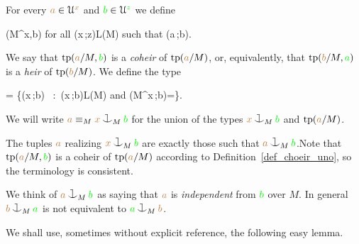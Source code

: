 \begin{definition}\label{def_coheir_idepencence} 
  For every ${\color{brown} a}\in\EuScript U^{\color{brown} x}$ and ${\color{green} b}\in\EuScript U^{\color{green} z}$ we define

  \noindent\llap{\textcolor{red}{\Large\warning}\kern1.5ex}
  {\IFF}
  {\phi(M^{\mr x},{\gr b})\neq\0
  \textrm{ for all }\phi({\mr x}\,;{\gr z})\in L(M) 
  \textrm{ such that }\phi({\mr a}\,;{\gr b})}.

  We say that ${\rm tp}({\color{brown} a}/M,{\color{green} b})$ is a \emph{coheir} of ${\rm tp}({\color{brown} a}/M)$, or, equivalently, that ${\rm tp}({\color{brown} b}/M,{\color{green} a})$ is a \emph{heir} of ${\rm tp}({\color{brown} b}/M)$.
  We define the type

  {=}
  {\Big\{\neg\phi({\mr x}\,;{\gr b})
  \ :\ 
  \phi({\mr x}\,;{\gr b})\in L(M)
  \textrm{ and } \phi(M^{\mr x}\,;{\gr b})=\0\Big\}.}

  We will write \emph{${\mr a}\equiv_M{\mr x}\cnonfork_M{\gr b}$} 
  for the union of the types ${\mr x}\cnonfork_M{\gr b}$ and 
  ${\rm tp}({\color{brown} a}/M)$.
\end{definition}
 The tuples ${\color{brown} a}$ realizing ${\mr x}\cnonfork_M{\gr b}$ are exactly those such that ${\mr a}\cnonfork_M{\gr b}$.Note that ${\rm tp}({\color{brown} a}/M,{\color{green} b})$ is a coheir of ${\rm tp}({\color{brown} a}/M)$ according to Definition~\ref{def_choeir_uno}, so the terminology is consistent.

We think of  ${\mr a}\cnonfork_M{\gr b}$ as saying that 
${\color{brown} a}$ is \emph{independent\/} from ${\color{green} b}$ over $M$.
%
%
In general %
${\mr b}\cnonfork_M{\gr a}$ is not 
equivalent to ${\gr a}\cnonfork_M{\mr b}$.

We shall use, sometimes without explicit reference, the following easy lemma.

